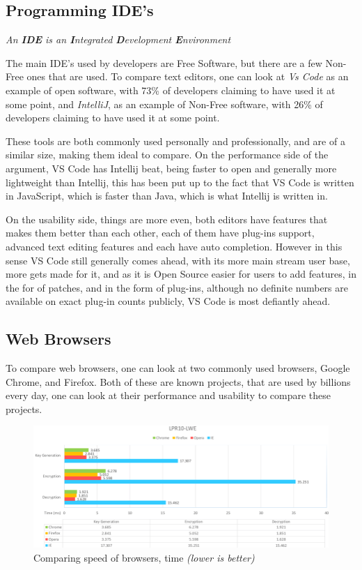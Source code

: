 \documentclass[a4paper,12pt]{article}
\begin{document}
{\subsection{Programming IDE's} \textit{An \textbf{IDE} is an \textbf{I}ntegrated \textbf{D}evelopment
\textbf{E}nvironment}

The main IDE's used by developers are Free Software, but there are a few Non-Free ones that are used.  To compare
text editors, one can look at \textit{Vs Code} as an example of open software, with 73\% of developers claiming
to have used it at some point, and \textit{IntelliJ}, as an example of Non-Free software, with 26\% of developers
claiming to have used it at some point\cite{IDEusage}.

These tools are both commonly used personally and professionally, and are of a similar size, making them ideal to
compare. On the performance side of the argument, VS Code has Intellij beat, being faster to open and generally
more lightweight than Intellij, this has been put up to the fact that VS Code is written in JavaScript, which is
faster than Java, which is what Intellij is written in\cite{VSCODEvsintellij}.

On the usability side, things are more even, both editors have features that makes them better than each other,
each of them have plug-ins support, advanced text editing features and each have auto completion. However in this
sense VS Code still generally comes ahead, with its more main stream user base, more gets made for it, and as it
is Open Source easier for users to add features, in the for of patches, and in the form of plug-ins, although no
definite numbers are available on exact plug-in counts publicly, VS Code is most defiantly ahead.

\subsection{Web Browsers} To compare web browsers, one can look at two commonly used browsers, Google Chrome, and
Firefox. Both of these are known projects, that are used by billions every day, one can look at their performance
and usability to compare these projects.

\begin{figure}[h]
	\caption{Comparing speed of browsers, time \textit{(lower is better)}}
	\includegraphics[width=\textwidth]{webbrowserperfomace.png} 
\end{figure}

}
\end{document}
